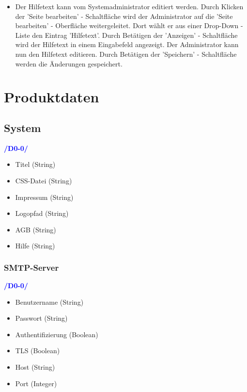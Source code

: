 \documentclass[a4paper]{scrreprt}
\newcounter{Lc}
\newcounter{Hc}
\newcommand{\resetAllCounter}{\setcounter{Lc}{0}\setcounter{Hc}{1}}
\begin{document}
\begin{itemize}
			   	\item {}
				    Der Hilfetext kann vom Systemadministrator editiert werden. Durch Klicken der 'Seite bearbeiten' - Schaltfläche wird der Administrator auf die 'Seite bearbeiten' - Oberfläche weitergeleitet. Dort wählt er aus einer Drop-Down - Liste den Eintrag 'Hilfetext'. Durch Betätigen der 'Anzeigen' - Schaltfläche wird der Hilfetext in einem Eingabefeld angezeigt. Der Administrator kann nun den Hilfetext editieren. Durch Betätigen der 'Speichern' - Schaltfläche werden die Änderungen gespeichert. 
			\end{itemize}
		
\resetAllCounter
\renewcommand{\Func}[1]{\stepcounter{Lc}\textcolor{Blue}{\textbf{/D\arabic{Hc}0-\arabic{Lc}0/} #1} \\}	

\chapter{Produktdaten}
 \label{Produktdaten}
        
	
    \section{System}
	     \Func {} 
	     \begin{itemize}
	     	\item Titel (String)
	     	\item CSS-Datei (String)
	     	\item Impressum (String)
	     	\item Logopfad (String)
	     	\item AGB (String)
	     	\item Hilfe (String)
	     \end{itemize}
	    
	    
	    \subsection{SMTP-Server}
		    \Func {}
		    \begin{itemize}
		    	\item Benutzername (String)
		    	\item Passwort (String)
		    	\item Authentifizierung (Boolean)
		    	\item TLS (Boolean)
		    	\item Host (String)
		    	\item Port (Integer)
		    \end{itemize}
	    
\end{document}
